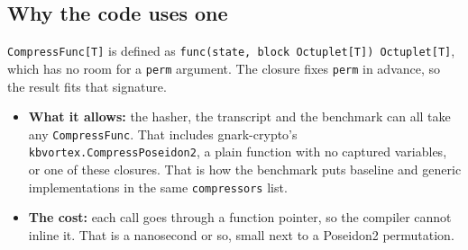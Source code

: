 \documentclass[10pt,a4paper]{article}
\begin{document}
\subsection{Why the code uses one}

\texttt{CompressFunc[T]} is defined as \texttt{func(state, block Octuplet[T]) Octuplet[T]},
which has no room for a \texttt{perm} argument. The closure fixes \texttt{perm} in advance,
so the result fits that signature.
\begin{itemize}
  \item \textbf{What it allows:} the hasher, the transcript and the benchmark can all take
    any \texttt{CompressFunc}. That includes gnark-crypto's
    \texttt{kbvortex.CompressPoseidon2}, a plain function with no captured variables, or one
    of these closures. That is how the benchmark puts baseline and generic implementations
    in the same \texttt{compressors} list.
  \item \textbf{The cost:} each call goes through a function pointer, so the compiler cannot
    inline it. That is a nanosecond or so, small next to a Poseidon2 permutation.
\end{itemize}
\end{document}
